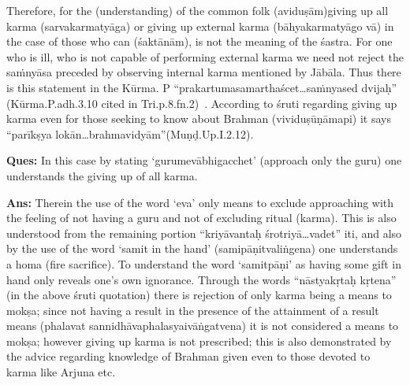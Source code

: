 Therefore, for the (understanding) of the common folk (aviduṣām)\break giving up all karma (sarvakarmatyāga) or giving up external karma (bāhyakarmatyāgo vā) in the case of those who can (śaktānām), is not the meaning of the śastra. For one who is ill, who is not capable of performing external karma we need not reject the saṁnyāsa preceded by observing internal karma mentioned by Jābāla. Thus there is this statement in the Kūrma. P “prakartumasamarthaścet…saṁnyased dvijaḥ” (Kūrma.P.adh.3.10 cited in Tri.p.8.fn.2) .  According to śruti regarding giving up karma even for those seeking to know about Brahman (vividuṣūṇāmapi) it says “parīkṣya lokān…brahmavidyām”\break (Muṇḍ.Up.I.2.12).

\textbf{Ques:} In this case by stating ‘gurumevābhigacchet’ (approach only the guru) one understands the giving up of all karma. 

\textbf{Ans:} Therein the use of the word ‘eva’ only means to exclude approaching with the feeling of not having a guru and not of excluding ritual (karma). This is also understood from the remaining portion “kriyāvantaḥ śrotriyā…vadet” iti, and also by the use of the word ‘samit in the hand’ (samipāṇitvaliṅgena) one understands a homa (fire sacrifice). To understand the word ‘samitpāṇi’ as having some gift in hand only reveals one’s own ignorance. Through the words “nāstyakṛtaḥ kṛtena” (in the above śruti quotation) there is rejection of only karma being a means to mokṣa; since not having a result in the presence of the attainment of a result means (phalavat sannidhāvaphalasyaivāṅgatvena) it is not considered a means to mokṣa; however giving up karma is not prescribed; this is also demonstrated by the advice regarding knowledge of Brahman given even to those devoted to karma like Arjuna etc.

